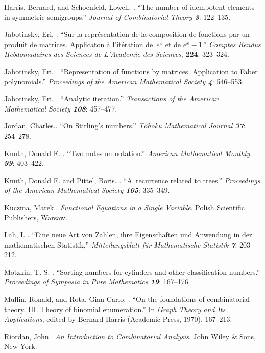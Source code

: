 \bib
Harris, Bernard,  and Schoenfeld, Lowell. . \bibspace
 ``The number of
idempotent elements in symmetric semigroups.'' {\sl Journal of
Combinatorial Theory\/ \bf 3}: 122--135.

\bib
Jabotinsky, Eri. . \bibspace
 ``Sur la repr\'esentation
de la composition de fonctions par un produit de matrices. Applicaton
\`a l'it\'eration de~$e^x$ et de $e^x-1$.'' {\sl Comptes Rendus
Hebdomadaires des Sciences de L'Academie des Sciences}, {\bf 224}: 323--324.

\bib
Jabotinsky, Eri. . \bibspace
``Representation of functions by matrices.
Application to Faber polynomials.'' {\sl Proceedings of the American
Mathematical Society\/ \bf 4}: 546--553.

\bib
Jabotinsky, Eri. . \bibspace
 ``Analytic iteration.'' {\sl Transactions of
the American Mathematical Society\/ \bf 108}: 457--477.

\bib
Jordan, Charles..\bibspace
``On Stirling's numbers.'' {\sl T{\^o}hoku Mathematical Journal\/ \bf
37}: 254--278.

\bib
Knuth, Donald E. . \bibspace
 ``Two notes on notation.'' {\sl American
Mathematical Monthly\/ \bf 99}: 403--422.

\bib
Knuth, Donald E. and Pittel, Boris. . \bibspace
 ``A~recurrence related to
trees.''
{\sl Proceedings of the American Mathematical Society\/ \bf 105}:
335--349.

\bib
Kuczma, Marek..\bibspace
{\sl Functional Equations in a Single Variable}. Polish Scientific
Publishers, Warsaw.

\bib
Lah, I. . \bibspace
 ``Eine neue Art von Zahlen, ihre Eigenschaften und
Anwendung in der mathemat\-ischen Statistik,'' {\sl Mitteilungsblatt
f\"ur Mathematische Statistik\/ \bf 7}: 203--212.

\bib
Motzkin, T. S. . \bibspace
 ``Sorting numbers for cylinders and other
classification numbers.'' {\sl Proceedings of Symposia in Pure
Mathematics\/ \bf 19}: 167--176.

\bib
Mullin, Ronald, and Rota, Gian-Carlo. .  \bibspace
``On the foundations of combinatorial theory. III. Theory of binomial
enumeration.'' In {\sl Graph Theory and Its Applications}, edited by
Bernard Harris (Academic Press, 1970), 167--213.

\bib
Riordan, John..\bibspace
{\sl An Introduction to Combinatorial Analysis}. John Wiley \& Sons,
New York.

